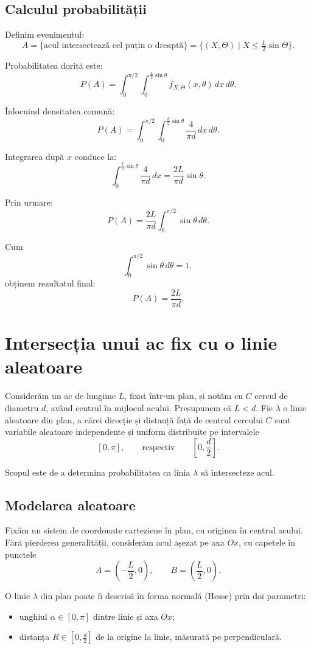 \documentclass[12pt]{article}
\begin{document}
\subsection{Calculul probabilității}

Definim evenimentul:
\[
A = \{\text{acul intersectează cel puțin o dreaptă}\}
= \{(X,\Theta)\mid X \le \tfrac{L}{2}\sin\Theta\}.
\]

Probabilitatea dorită este:
\[
P(A) = \int_0^{\pi/2} \int_0^{\frac{L}{2}\sin\theta}
f_{X,\Theta}(x,\theta)\,dx\,d\theta.
\]

Înlocuind densitatea comună:
\[
P(A)
= \int_0^{\pi/2} \int_0^{\frac{L}{2}\sin\theta}
\frac{4}{\pi d}\,dx\,d\theta.
\]

Integrarea după $x$ conduce la:
\[
\int_0^{\frac{L}{2}\sin\theta} \frac{4}{\pi d}\,dx
= \frac{2L}{\pi d}\sin\theta.
\]

Prin urmare:
\[
P(A) = \frac{2L}{\pi d} \int_0^{\pi/2} \sin\theta\,d\theta.
\]

Cum
\[
\int_0^{\pi/2} \sin\theta\,d\theta = 1,
\]
obținem rezultatul final:
\[
\boxed{P(A) = \frac{2L}{\pi d}}.
\]


\newpage
{}\par
\section{Intersecția unui ac fix cu o linie aleatoare}

Considerăm un ac de lungime $L$, fixat într-un plan, și notăm cu $C$ cercul de diametru $d$, având centrul în mijlocul acului. Presupunem că $L<d$. Fie $\lambda$ o linie aleatoare din plan, a cărei direcție și distanță față de centrul cercului $C$ sunt variabile aleatoare independente și uniform distribuite pe intervalele
\[
[0,\pi], \qquad \text{respectiv} \qquad \left[0,\frac{d}{2}\right].
\]

Scopul este de a determina probabilitatea ca linia $\lambda$ să intersecteze acul.

\subsection{Modelarea aleatoare}

Fixăm un sistem de coordonate carteziene în plan, cu originea în centrul acului. Fără pierderea generalității, considerăm acul așezat pe axa $Ox$, cu capetele în punctele
\[
A=\left(-\frac{L}{2},0\right), 
\qquad 
B=\left(\frac{L}{2},0\right).
\]

O linie $\lambda$ din plan poate fi descrisă în forma normală (Hesse) prin doi parametri:
\begin{itemize}
  \item unghiul $\alpha\in[0,\pi]$ dintre linie și axa $Ox$;
  \item distanța $R\in\left[0,\frac{d}{2}\right]$ de la origine la linie, măsurată pe perpendiculară.
\end{itemize}
\end{document}

